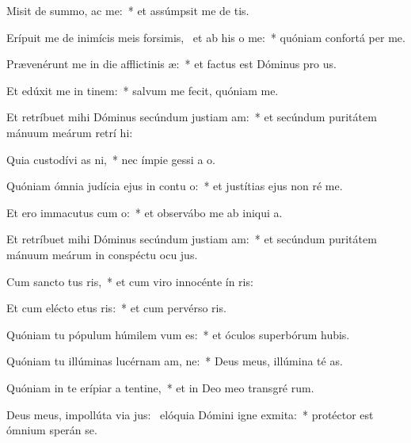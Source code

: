 \item Misit de summo,  ac me:~* et assúmpsit me de  tis.
\item Erípuit me de inimícis meis forsimis,~\pscross{} et ab his  o me:~* quóniam confortá  per me.
\item Prævenérunt me in die afflictinis æ:~* et factus est Dóminus pro us.
\item Et edúxit me in tinem:~* salvum me fecit, quóniam  me.
\item Et retríbuet mihi Dóminus secúndum justiam am:~* et secúndum puritátem mánuum meárum retrí hi:
\item Quia custodívi as ni,~* nec ímpie gessi a  o.
\item Quóniam ómnia judícia ejus in contu o:~* et justítias ejus non ré  me.
\item Et ero immacutus cum o:~* et observábo me ab iniqui a.
\item Et retríbuet mihi Dóminus secúndum justiam am:~* et secúndum puritátem mánuum meárum in conspéctu ocu jus.
\item Cum sancto tus ris,~* et cum viro innocénte ín ris:
\item Et cum elécto etus ris:~* et cum pervérso ris.
\item Quóniam tu pópulum húmilem vum es:~* et óculos superbórum hubis.
\item Quóniam tu illúminas lucérnam am, ne:~* Deus meus, illúmina té as.
\item Quóniam in te erípiar a tentine,~* et in Deo meo transgré rum.
\item Deus meus, impollúta via jus:~\pscross{} elóquia Dómini igne exmita:~* protéctor est ómnium sperán  se.
